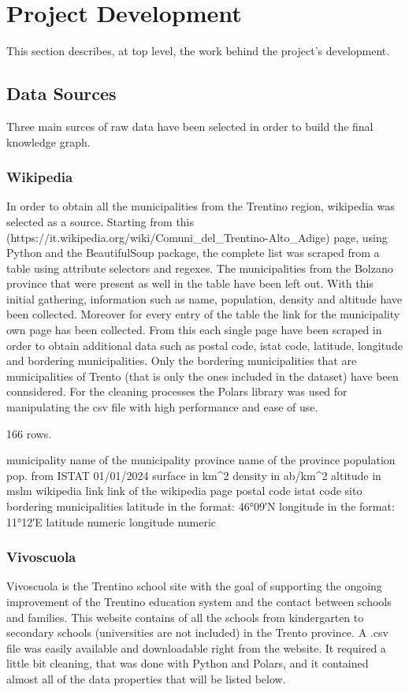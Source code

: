 \section{Project Development}
This section describes, at top level, the work behind the project's development.

\subsection{Data Sources}
Three main surces of raw data have been selected in order to build the final knowledge graph.

\subsubsection{Wikipedia}
In order to obtain all the municipalities from the Trentino region, wikipedia was selected as a source.
Starting from this (https://it.wikipedia.org/wiki/Comuni_del_Trentino-Alto_Adige) page, using Python and the BeautifulSoup package, the complete list was scraped from a table using attribute selectors and regexes.
The municipalities from the Bolzano province that were present as well in the table have been left out. With this initial gathering, information such as name, population, density and altitude have been collected.
Moreover for every entry of the table the link for the municipality own page has been collected. From this each single page have been scraped in order to obtain additional data such as postal code, istat code, latitude, longitude and bordering municipalities.
Only the bordering municipalities that are municipalities of Trento (that is only the ones included in the dataset) have been connsidered. For the cleaning processes the Polars library was used for manipulating the csv file with high performance and ease of use.


166 rows.

municipality name of the municipality
province name of the province
population pop. from ISTAT 01/01/2024
surface in km^2
density in ab/km^2
altitude in mslm
wikipedia link link of the wikipedia page
postal code
istat code
sito
bordering municipalities
latitude in the format: 46°09′N
longitude in the format: 11°12′E
latitude numeric
longitude numeric

\subsubsection{Vivoscuola}
Vivoscuola is the Trentino school site with the goal of supporting the ongoing improvement of the Trentino education system and the contact between schools and families.
This website contains of all the schools from kindergarten to secondary schools (universities are not included) in the Trento province.
A .csv file was easily available and downloadable right from the website. It required a little bit cleaning, that was done with Python and Polars, and it contained almost all of the data properties that will be listed below.

